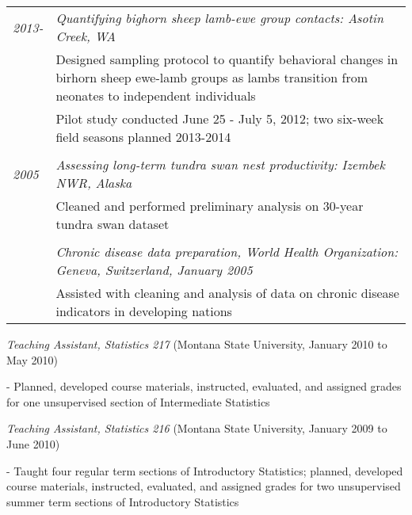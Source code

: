 \documentclass[9pt]{article}
\newenvironment{outerlist}[1][\enskip\textbullet]%
        {\begin{itemize}[#1]}{\end{itemize}%
         }
\newenvironment{innerlist}[1][\enskip\textbullet]%
        {\begin{compactitem}[#1]}{\end{compactitem}}
\begin{document}
\begin{tabular}{p{.5cm} p{15cm}}
\hspace{-1.75cm} \footnotesize{\textit{2013-}} & \hspace{-.5cm}\textit{Quantifying bighorn sheep lamb-ewe group contacts: Asotin Creek, WA}\\
& Designed sampling protocol to quantify behavioral changes in birhorn sheep ewe-lamb groups as lambs transition from neonates to independent individuals\\
& Pilot study conducted June 25 - July 5, 2012; two six-week field seasons planned 2013-2014\\
\\
\hspace{-1.75cm} \footnotesize{\textit{2005}} & \hspace{-.5cm}\textit{Assessing long-term tundra swan nest productivity: Izembek NWR, Alaska}\\
& Cleaned and performed preliminary analysis on 30-year tundra swan dataset\\
\\
& \hspace{-.5cm}\textit{Chronic disease data preparation, World Health Organization: Geneva, Switzerland, January 2005}\\
& Assisted with cleaning and analysis of data on chronic disease indicators in developing nations\\
\end{tabular}

\vspace{.15in}


\vspace{.15in}

\begin{outerlist}
  \item[] \textit{Teaching Assistant, Statistics 217} (Montana State University, January 2010 to May 2010)
		\begin{innerlist}
				\item[-] Planned, developed course materials, instructed, evaluated, and assigned grades for one unsupervised section of Intermediate Statistics
			\end{innerlist}

	\item[] \textit{Teaching Assistant, Statistics 216} (Montana State University, January 2009 to June 2010)
		\begin{innerlist}
				\item[-] Taught four regular term sections of Introductory Statistics; planned, developed course materials, instructed, evaluated, and assigned grades for two unsupervised summer term sections of Introductory Statistics
			\end{innerlist}
	\end{outerlist}
\end{document}
